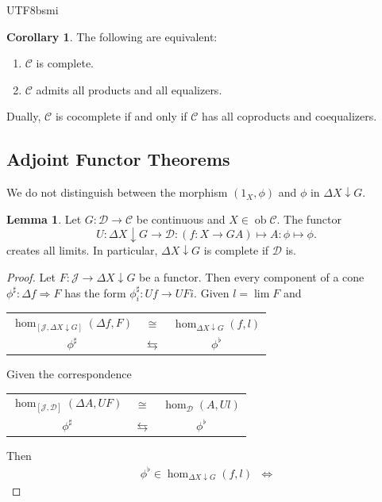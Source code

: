 \documentclass[12pt]{article}
\theoremstyle{definition}
\newtheorem{lemma}[definition]{Lemma}
\newtheorem{corollary}[definition]{Corollary}
\newcommand\<{\langle}
\renewcommand\>{\rangle}
\DeclareMathOperator{\ob}{ob}
\begin{document}
\begin{CJK}{UTF8}{bsmi}
\begin{corollary}
    The following are equivalent:
    \begin{enumerate}
        \item $\mathcal{C}$ is complete.
        \item $\mathcal{C}$ admits all products and all equalizers.
    \end{enumerate}
\end{corollary}

Dually, $\mathcal{C}$ is cocomplete if and only if $\mathcal{C}$ has all coproducts and coequalizers.

\subsection{Adjoint Functor Theorems}

We do not distinguish between the morphism $(1_X, \phi)$ and $\phi$ in $\Delta X\downarrow G$.

\begin{lemma}
\label{comma limit}
    Let $G:\mathcal{D}\to\mathcal{C}$ be continuous and $X\in\ob\mathcal{C}$.
    The functor
    \[
        U:\Delta X\downarrow G\to\mathcal{D}:(f:X\to GA)\mapsto A:\phi\mapsto\phi.
    \]
    creates all limits.
    In particular, $\Delta X\downarrow G$ is complete if $\mathcal{D}$ is.
\end{lemma}
\begin{proof}
    Let $F:\mathcal{J}\to\Delta X\downarrow G$ be a functor.
    Then every component of a cone $\phi^\sharp:\Delta f\Rightarrow F$ has the form $\phi^\sharp_i:Uf\to UFi$.
    Given $l=\lim F$ and
    \begin{center}
    \begin{tabular}{ccc}
        $\hom_{[\mathcal{J}, \Delta X\downarrow G]}(\Delta f, F)$ & $\cong$ & $\hom_{\Delta X\downarrow G}(f, l)$ \\[2pt]
        $\phi^\sharp$ & $\leftrightarrows$ & $\phi^\flat$
    \end{tabular} 
    \end{center}
    Given the correspondence
    \begin{center}
    \begin{tabular}{ccc}
        $\hom_{[\mathcal{J}, \mathcal{D}]}(\Delta A, UF)$ & $\cong$ & $\hom_\mathcal{D}(A, Ul)$ \\[2pt]
        $\phi^\sharp$ & $\leftrightarrows$ & $\phi^\flat$
    \end{tabular} 
    \end{center}
    Then 
    \begin{align*}
        \phi^\flat \in \hom_{\Delta X\downarrow G}(f, l) 
        & \iff 
    \end{align*}
\end{proof}


\end{CJK}
\end{document}
